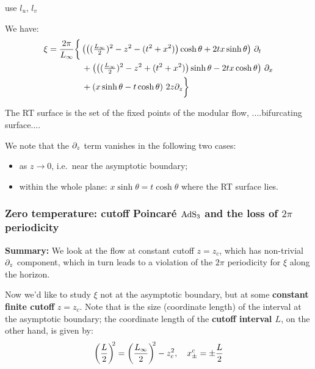 \documentclass[11pt,a4paper,utf8]{article}
\begin{document}
	
	{\color{red} use $l_u,\,l_v$}
	
	We have:
	\begin{gather}
	\begin{aligned}
		\xi &= \frac{2\pi}{L_\infty} \bigg\{
			\left(
				\left(
					(\tfrac{L_\infty}{2})^2 - z^2
					- (t^2 + x^2)
				\right) \cosh\theta
				+ 2tx \sinh\theta
			\right) \,\partial_{t}
		\\ &\qquad\qquad 
			+ \left(
				\left(
					(\tfrac{L_\infty}{2})^2 - z^2
					+ (t^2 + x^2)
				\right) \sinh\theta
				- 2tx \cosh\theta
			\right) \,\partial_{x}
		\\ &\qquad\qquad 
			+ \left(
				x\sinh\theta
				- t\cosh\theta
			\right) \,2z\partial_{z}
		\bigg\}
	\end{aligned}
	\end{gather}
	
The RT surface is the set of the fixed points of the modular flow, ....bifurcating surface....



	
	We note that the $\partial_{z}$ term vanishes in the following two cases:
	\begin{itemize}%
	\item as $z\to 0$, i.e.~near the asymptotic boundary;
	\item within the whole plane: $
			x\sinh\theta
			= t\cosh\theta
		$ where the RT surface lies. 
	\end{itemize}
	
\subsubsection{Zero temperature: cutoff Poincar\'e $\mathrm{AdS}_3$ and the loss of $2\pi$ periodicity}

\textbf{Summary:} We look at the flow at constant cutoff $z = z_c$, which has non-trivial $\partial_{z}$ component, which in turn leads to a violation of the $2\pi$ periodicity for $\xi$ along the horizon.
	
	Now we'd like to study $\xi$ not at the asymptotic boundary, but at some \textbf{constant finite cutoff} $z = z_c$. 
	Note that is the size (coordinate length) of the interval at the {asymptotic boundary}; the coordinate length of the \textbf{cutoff interval $L$}, on the other hand, is given by:
	\begin{equation}
		\left(\frac{L}{2}\right)^{\!\!2}
		= \left(\frac{L_\infty}{2}\right)^{\!\!2} - z_c^2,
	\quad
		x_\pm^c
		= \pm \frac{L}{2}
	\label{eq:length_relations}
	\end{equation}
	
\end{document}
